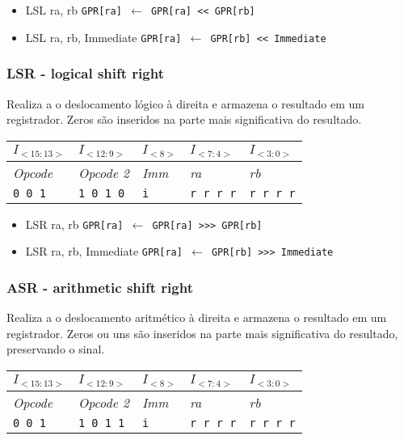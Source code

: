\documentclass[11pt,a4paper]{report}
\begin{document}
\begin{itemize}
\item LSL ra, rb
\subitem \texttt{GPR[ra] $\leftarrow$ GPR[ra] << GPR[rb]}
\item LSL ra, rb, Immediate
\subitem \texttt{GPR[ra] $\leftarrow$ GPR[rb] << Immediate}
\end{itemize}

\subsubsection{LSR - logical shift right}

Realiza a o deslocamento lógico à direita e armazena o resultado em um
registrador. Zeros são inseridos na parte mais significativa do resultado.

\begin{table}[htb!]
\centering
\begin{tabular}{|p{2cm}|p{2cm}|p{2cm}|p{2cm}|p{2cm}|}
\hline
$I_{<15:13>}$ & $I_{<12:9>}$ & $I_{<8>}$ & $I_{<7:4>}$ & $I_{<3:0>}$  \\ \hline
\textit{Opcode} & \textit{Opcode 2} & \textit{Imm} & \textit{ra} & \textit{rb} \\ \hline
\texttt{0 0 1} & \texttt{1 0 1 0} & \texttt{i} & \texttt{r r r r} & \texttt{r r r r} \\ \hline
\end{tabular}
\end{table}

\begin{itemize}
\item LSR ra, rb
\subitem \texttt{GPR[ra] $\leftarrow$ GPR[ra] >>> GPR[rb]}
\item LSR ra, rb, Immediate
\subitem \texttt{GPR[ra] $\leftarrow$ GPR[rb] >>> Immediate}
\end{itemize}

\subsubsection{ASR - arithmetic shift right}

Realiza a o deslocamento aritmético à direita e armazena o resultado em
um registrador. Zeros ou uns são inseridos na parte mais significativa
do resultado, preservando o sinal.

\begin{table}[htb!]
\centering
\begin{tabular}{|p{2cm}|p{2cm}|p{2cm}|p{2cm}|p{2cm}|}
\hline
$I_{<15:13>}$ & $I_{<12:9>}$ & $I_{<8>}$ & $I_{<7:4>}$ & $I_{<3:0>}$  \\ \hline
\textit{Opcode} & \textit{Opcode 2} & \textit{Imm} & \textit{ra} & \textit{rb} \\ \hline
\texttt{0 0 1} & \texttt{1 0 1 1} & \texttt{i} & \texttt{r r r r} & \texttt{r r r r} \\ \hline
\end{tabular}
\end{table}
\end{document}
